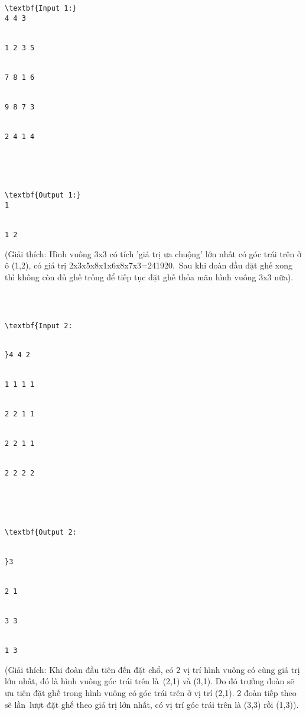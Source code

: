\begin{verbatim}
\textbf{Input 1:}
4 4 3


1 2 3 5


7 8 1 6


9 8 7 3


2 4 1 4





\textbf{Output 1:}
1


1 2\end{verbatim}

   (Giải thích: Hình vuông 3x3 có tích 'giá trị ưa chuộng' lớn nhất có góc trái trên ở ô (1,2), có giá trị 2x3x5x8x1x6x8x7x3=241920. Sau khi đoàn đầu đặt ghế xong thì không còn đủ ghế trống để tiếp tục đặt ghế thỏa mãn hình vuông 3x3 nữa).  
\begin{verbatim}



\textbf{Input 2:


}4 4 2


1 1 1 1


2 2 1 1


2 2 1 1


2 2 2 2





\textbf{Output 2:


}3


2 1


3 3


1 3\end{verbatim}




   (Giải thích: Khi đoàn đầu tiên đến đặt chổ, có 2 vị trí hình vuông có cùng giá trị lớn nhất, đó là hình vuông góc trái trên là (2,1) và (3,1). Do đó trưởng đoàn sẽ ưu tiên đặt ghế trong hình vuông có góc trái trên ở vị trí (2,1). 2 đoàn tiếp theo sẽ lần lượt đặt ghế theo giá trị lớn nhất, có vị trí góc trái trên là (3,3) rồi (1,3)).